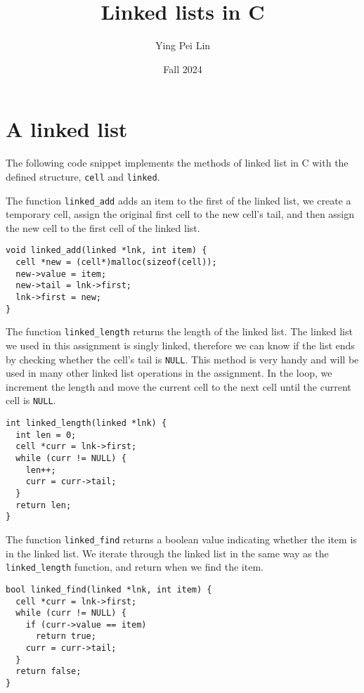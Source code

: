 \documentclass[a4paper,11pt]{article}
\begin{document}
\title{
  \textbf{Linked lists in C}
}
\author{Ying Pei Lin}
\date{Fall 2024}

\maketitle

\section*{A linked list}

The following code snippet implements the methods of linked list in C 
with the defined structure, {\tt cell} and {\tt linked}. 

The function {\tt linked\_add} adds an item to the first of the linked list, 
we create a temporary cell, assign the original first cell to the new cell's tail, and
then assign the new cell to the first cell of the linked list.

\begin{verbatim}
void linked_add(linked *lnk, int item) {
  cell *new = (cell*)malloc(sizeof(cell));
  new->value = item;
  new->tail = lnk->first;
  lnk->first = new;
}
\end{verbatim}

The function {\tt linked\_length} returns the length of the linked list.
The linked list we used in this assignment is singly linked, therefore we
can know if the list ends by checking whether the cell's tail is {\tt NULL}. This method
is very handy and will be used in many other linked list operations in the assignment.
In the loop, we increment the length and move the current cell to the next 
cell until the current cell is {\tt NULL}.

\begin{verbatim}
int linked_length(linked *lnk) {
  int len = 0;
  cell *curr = lnk->first;
  while (curr != NULL) {
    len++;
    curr = curr->tail;
  }
  return len;
}
\end{verbatim}

The function {\tt linked\_find} returns a boolean value indicating whether the item is in the linked list.
We iterate through the linked list in the same way as the {\tt linked\_length} function,
and return when we find the item.

\begin{verbatim}
bool linked_find(linked *lnk, int item) {
  cell *curr = lnk->first;
  while (curr != NULL) {
    if (curr->value == item)
      return true;
    curr = curr->tail;
  }
  return false;
}
\end{verbatim}
\end{document}
